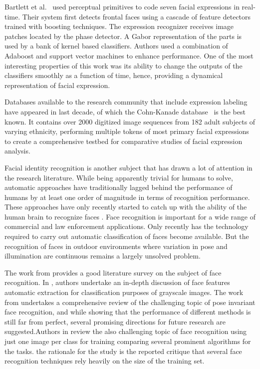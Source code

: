 \documentclass[]{article}
\begin{document}
Bartlett et al.~\cite{Bartlett4624313} used perceptual primitives to code seven facial expressions in real-time. Their system
first detects frontal faces using a cascade of feature detectors trained with boosting techniques. The expression
recognizer receives image patches located by the phase detector. A Gabor representation of the parts is used  by a bank
of kernel based classifiers. Authors used a combination of Adaboost and support vector machines to enhance performance.
One of the most interesting properties of this work was its ability to change the outputs of the classifiers smoothly
as a function of time, hence, providing a dynamical representation of facial expression.

Databases available to the research community that include expression labeling have appeared in last decade, of which
the Cohn-Kanade database~\cite{Cohn840611} is the best known. It contains over 2000 digitized image sequences from  182
adult subjects of varying ethnicity, performing multiple tokens of most primary facial expressions to create a
comprehensive testbed for comparative studies of facial expression analysis.


Facial identity recognition is another subject that has drawn a lot of attention in the research literature. While being
apparently trivial for humans to solve, automatic approaches have traditionally lagged behind the performance of humans
by at least one order of magnitude in terms of recognition performance. These approaches have only recently started to
catch up with the ability of the human brain to recognize faces \cite{onintelligence, Rozado2012b}. Face recognition is
important  for a wide range of commercial and law enforcement applications. Only recently has the technology required to
carry out automatic classification of faces become available. But the recognition of faces in outdoor environments 
where variation in pose and illumination are continuous remains a largely unsolved problem.


The work from \cite{Zhao:2003} provides a good literature survey on the subject of face recognition. In
\cite{Craw1987183}, authors undertake an in-depth discussion of face features automatic extraction for classification
purposes of grayscale images. The work from \cite{Zhang20092876} undertakes a comprehensive review  of the challenging
topic of pose invariant face recognition, and while showing that the performance of different methods is still far from
perfect, several promising directions for future research  are suggested.Authors in \cite{Tan20061725} review the also
challenging topic of face recognition using  just one image per class for training comparing several prominent
algorithms for the tasks. the rationale for the study is the reported critique that several face recognition techniques
rely heavily on the size of the training set.
\end{document}

